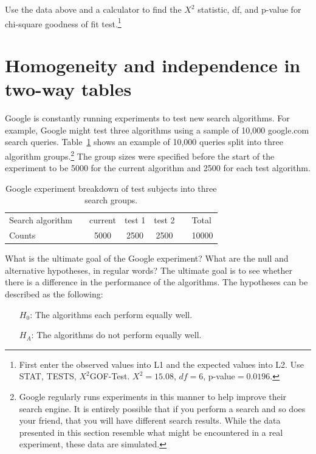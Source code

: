 \begin{exercise}
Use the data above and a calculator to find the $X^2$ statistic, df, and p-value for chi-square goodness of fit test.\footnote{First enter the observed values into L1 and the expected values into L2. Use STAT, TESTS, $X^2$GOF-Test. $X^2=15.08$, $df=6$, p-value$=0.0196$.}
\end{exercise}



\section{Homogeneity and independence in two-way tables}
\label{twoWayTablesAndChiSquare}


Google is constantly running experiments to test new search algorithms. For example, Google might test three algorithms using a sample of 10,000 google.com search queries. Table~\ref{googleSearchAlgorithmByAlgorithmOnly} shows an example of 10,000 queries split into three algorithm groups.\footnote{Google regularly runs experiments in this manner to help improve their search engine. It is entirely possible that if you perform a search and so does your friend, that you will have different search results. While the data presented in this section resemble what might be encountered in a real experiment, these data are simulated.} The group sizes were specified before the start of the experiment to be 5000 for the current algorithm and 2500 for each test algorithm.

\begin{table}[h]
\centering
\begin{tabular}{ll ccc ll}
\hline
Search algorithm	 & \hspace{1mm} & current & test 1 & test 2 & \hspace{1mm} & Total \\
Counts &		& 5000 & 2500 & 2500 & & 10000 \\
\hline
\end{tabular}
\caption{Google experiment breakdown of test subjects into three search groups.}
\label{googleSearchAlgorithmByAlgorithmOnly}
\end{table}


\begin{example}{What is the ultimate goal of the Google experiment? What are the null and alternative hypotheses, in regular words?}
The ultimate goal is to see whether there is a difference in the performance of the algorithms. The hypotheses can be described as the following:
\begin{itemize}
\item[$H_0$:] The algorithms each perform equally well.
\item[$H_A$:] The algorithms do not perform equally well.
\end{itemize}
\end{example}

